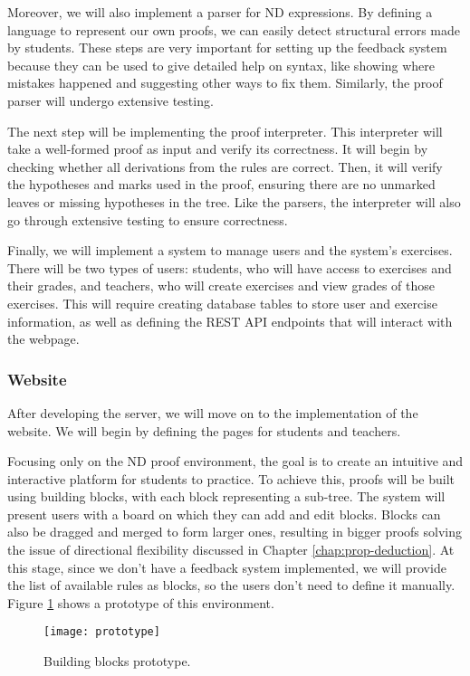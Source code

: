 Moreover, we will also implement a parser for \gls{ND} expressions. By defining a language to represent our own proofs, we can easily detect structural errors made by students. These steps are very important for setting up the feedback system because they can be used to give detailed help on syntax, like showing where mistakes happened and suggesting other ways to fix them. Similarly, the proof parser will undergo extensive testing.

The next step will be implementing the proof interpreter. This interpreter will take a well-formed proof as input and verify its correctness. It will begin by checking whether all derivations from the rules are correct. Then, it will verify the hypotheses and marks used in the proof, ensuring there are no unmarked leaves or missing hypotheses in the tree. Like the parsers, the interpreter will also go through extensive testing to ensure correctness.

Finally, we will implement a system to manage users and the system's exercises. There will be two types of users: students, who will have access to exercises and their grades, and teachers, who will create exercises and view grades of those exercises. This will require creating database tables to store user and exercise information, as well as defining the REST API endpoints that will interact with the webpage.

\subsubsection{Website}
After developing the server, we will move on to the implementation of the website. We will begin by defining the pages for students and teachers. 

Focusing only on the \gls{ND} proof environment, the goal is to create an intuitive and interactive platform for students to practice. To achieve this, proofs will be built using building blocks, with each block representing a sub-tree. The system will present users with a board on which they can add and edit blocks. Blocks can also be dragged and merged to form larger ones, resulting in bigger proofs solving the issue of directional flexibility discussed in Chapter \ref{chap:prop-deduction}. At this stage, since we don't have a feedback system implemented, we will provide the list of available rules as blocks, so the users don't need to define it manually. Figure \ref{img:building-blocks} shows a prototype of this environment.

\begin{figure}[htbp]
    \centering
    \texttt{[image: prototype]}
    \caption{Building blocks prototype.}
    \label{img:building-blocks}
\end{figure}

